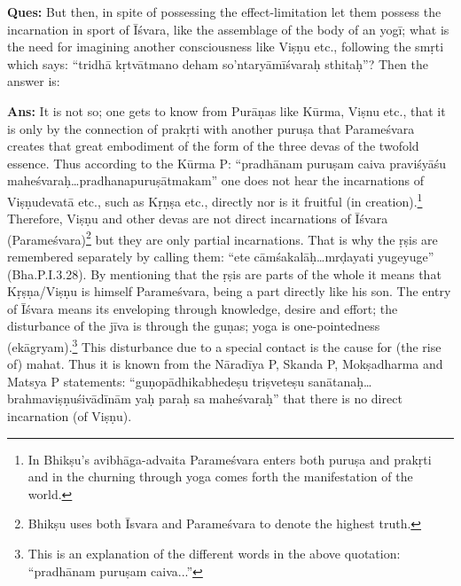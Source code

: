 \textbf{Ques:}  But then, in spite of possessing the effect-limitation let them possess the incarnation in sport of Īśvara, like the assemblage of the body of an yogī; what is the need for imagining another consciousness like Viṣṇu etc., following the smṛti which says: “tridhā kṛtvātmano deham so’ntaryāmīśvaraḥ sthitaḥ”? Then the answer is: 

\textbf{Ans:} It is not so; one gets to know from Purāṇas like Kūrma, Viṣnu etc., that it is only by the connection of prakṛti with another puruṣa that Parameśvara creates that great embodiment of the form of the three devas of the twofold essence. Thus according to the Kūrma P: “pradhānam puruṣam caiva praviśyāśu maheśvaraḥ…pradhanapuruṣātmakam” one does not hear the incarnations of Viṣṇudevatā etc., such as Kṛṇṣa etc., directly nor is it fruitful (in creation).\footnote{In Bhikṣu’s avibhāga-advaita Parameśvara enters both puruṣa and prakṛti and in the churning through yoga comes forth the manifestation of the world.} Therefore, Viṣṇu and other devas are not direct incarnations of Īśvara (Parameśvara)\footnote{Bhikṣu uses both Īsvara and Parameśvara to denote the highest truth.} but they are only partial incarnations. That is why the ṛṣis are remembered separately by calling them: “ete cāmśakalāḥ…mrḍayati yuge\break yuge” (Bha.P.I.3.28). By mentioning that the ṛṣis are parts of the whole it means that Kṛṣṇa/Viṣṇu is himself Parameśvara, being a part directly like his son. The entry of Īśvara means its enveloping through knowledge, desire and effort;   the disturbance of the jīva is through the guṇas; yoga is one-pointedness (ekāgryam).\footnote{This is an explanation of the different words in the above quotation: “pradhānam puruṣam caiva...”} This disturbance due to a special contact is the cause for (the rise of) mahat. Thus it is known from the Nāradīya P, Skanda P, Mokṣadharma and Matsya P statements: “guṇopādhikabhedeṣu triṣveteṣu sanātanaḥ…brahma\-viṣṇuśivādīnām yaḥ paraḥ sa maheśvaraḥ” that there is no direct incarnation (of Viṣṇu).

